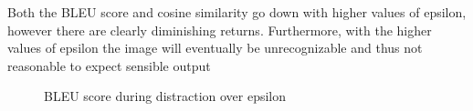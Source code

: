 Both the BLEU score and cosine similarity go down with higher values of epsilon, however there are clearly diminishing returns. Furthermore, with the higher values of epsilon the image will eventually be unrecognizable and thus not reasonable to expect sensible output

\begin{figure}[h]
    \vspace{\floatsep}

    \caption{BLEU score during distraction over epsilon}
\end{figure}
